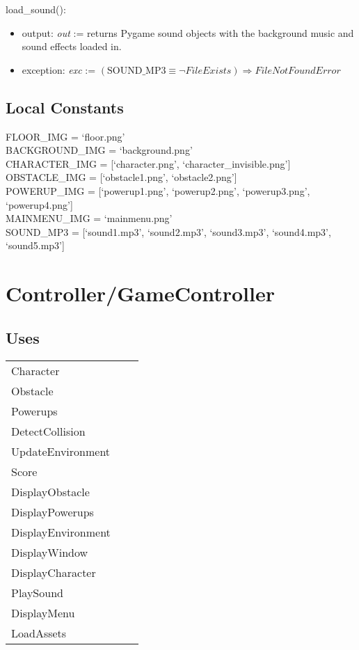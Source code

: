\documentclass[12pt]{article}
\begin{document}
load\_sound():
\begin{itemize}
    \item output: \textit{out} := returns Pygame sound objects with the background music and sound effects loaded in.
    \item exception: \textit{exc} := $(\text{SOUND\_MP3} \equiv \neg FileExists) \Rightarrow FileNotFoundError$
\end{itemize}
\subsection*{Local Constants}
FLOOR\_IMG = `floor.png' \\
BACKGROUND\_IMG = `background.png' \\
CHARACTER\_IMG = [`character.png', `character\_invisible.png']\\
OBSTACLE\_IMG = [`obstacle1.png', `obstacle2.png']\\
POWERUP\_IMG = [`powerup1.png', `powerup2.png', `powerup3.png', `powerup4.png']\\
MAINMENU\_IMG = `mainmenu.png'\\ 
SOUND\_MP3 = [`sound1.mp3', `sound2.mp3', `sound3.mp3', `sound4.mp3', `sound5.mp3']\\

\medskip

\newpage
\section*{Controller/GameController}

\subsection* {Uses}

\begin{tabular}{lll}
    Character & \\
    Obstacle & \\
    Powerups & \\
    DetectCollision & \\
    UpdateEnvironment & \\
    Score & \\
    DisplayObstacle & \\
    DisplayPowerups & \\
    DisplayEnvironment & \\
    DisplayWindow & \\
    DisplayCharacter & \\
    PlaySound & \\
    DisplayMenu & \\
    LoadAssets 
\end{tabular}
\end{document}
